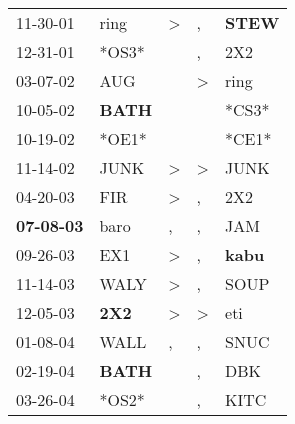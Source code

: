 \begin{supertabular}{p{0.07\textwidth}p{0.06\textwidth}p{0.02\textwidth}p{0.02\textwidth}p{0.06\textwidth}}
          11-30-01\textsuperscript{} &           ring\textsuperscript{} &  \textgreater &             , &  \textbf{STEW\textsuperscript{}} \\
          12-31-01\textsuperscript{} &                            *OS3* &               &             , &            2X2\textsuperscript{} \\
          03-07-02\textsuperscript{} &            AUG\textsuperscript{} &               &  \textgreater &           ring\textsuperscript{} \\
          10-05-02\textsuperscript{} &  \textbf{BATH\textsuperscript{}} &               &               &                            *CS3* \\
          10-19-02\textsuperscript{} &                            *OE1* &               &               &                            *CE1* \\
          11-14-02\textsuperscript{} &           JUNK\textsuperscript{} &  \textgreater &  \textgreater &           JUNK\textsuperscript{} \\
          04-20-03\textsuperscript{} &            FIR\textsuperscript{} &  \textgreater &             , &            2X2\textsuperscript{} \\
 \textbf{07-08-03\textsuperscript{}} &           baro\textsuperscript{} &             , &             , &            JAM\textsuperscript{} \\
          09-26-03\textsuperscript{} &            EX1\textsuperscript{} &  \textgreater &             , &  \textbf{kabu\textsuperscript{}} \\
          11-14-03\textsuperscript{} &           WALY\textsuperscript{} &  \textgreater &             , &           SOUP\textsuperscript{} \\
          12-05-03\textsuperscript{} &   \textbf{2X2\textsuperscript{}} &  \textgreater &  \textgreater &            eti\textsuperscript{} \\
          01-08-04\textsuperscript{} &           WALL\textsuperscript{} &             , &             , &           SNUC\textsuperscript{} \\
          02-19-04\textsuperscript{} &  \textbf{BATH\textsuperscript{}} &               &             , &            DBK\textsuperscript{} \\
          03-26-04\textsuperscript{} &                            *OS2* &               &             , &           KITC\textsuperscript{} \\

\end{supertabular}
